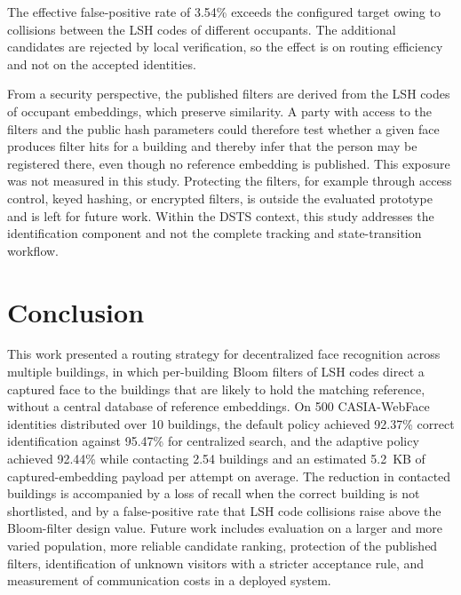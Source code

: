 \documentclass[pdflatex,sn-mathphys-num]{sn-jnl}%
\theoremstyle{thmstyleone}%
\theoremstyle{thmstyletwo}%
\theoremstyle{thmstylethree}%
\begin{document}
The effective false-positive rate of 3.54\% exceeds the configured target owing to collisions between the LSH codes of different occupants. The additional candidates are rejected by local verification, so the effect is on routing efficiency and not on the accepted identities.

From a security perspective, the published filters are derived from the LSH codes of occupant embeddings, which preserve similarity. A party with access to the filters and the public hash parameters could therefore test whether a given face produces filter hits for a building and thereby infer that the person may be registered there, even though no reference embedding is published. This exposure was not measured in this study. Protecting the filters, for example through access control, keyed hashing, or encrypted filters, is outside the evaluated prototype and is left for future work. Within the DSTS context, this study addresses the identification component and not the complete tracking and state-transition workflow.


\section{Conclusion}
\label{sec:conclusion}

This work presented a routing strategy for decentralized face recognition across multiple buildings, in which per-building Bloom filters of LSH codes direct a captured face to the buildings that are likely to hold the matching reference, without a central database of reference embeddings. On 500 CASIA-WebFace identities distributed over 10 buildings, the default policy achieved 92.37\% correct identification against 95.47\% for centralized search, and the adaptive policy achieved 92.44\% while contacting 2.54 buildings and an estimated 5.2~KB of captured-embedding payload per attempt on average. The reduction in contacted buildings is accompanied by a loss of recall when the correct building is not shortlisted, and by a false-positive rate that LSH code collisions raise above the Bloom-filter design value. Future work includes evaluation on a larger and more varied population, more reliable candidate ranking, protection of the published filters, identification of unknown visitors with a stricter acceptance rule, and measurement of communication costs in a deployed system.
\end{document}
